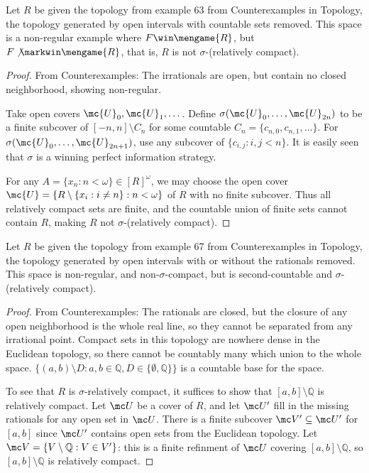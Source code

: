   \begin{ex}
  Let $R$ be given the topology from example 63 from Counterexamples in Topology, the topology generated by open intervals with countable sets removed. This space is a non-regular example where $F \win \mengame{R}$, but $F \not\markwin \mengame{R}$, that is, $R$ is not $\sigma$-(relatively compact).
  \end{ex}

  \begin{proof}
  From Counterexamples: The irrationals are open, but contain no closed neighborhood, showing non-regular.

  Take open covers $\mc{U}_0,\mc{U}_1,\dots$. Define $\sigma(\mc{U}_0,\dots,\mc{U}_{2n})$ to be a finite subcover of $[-n,n]\setminus C_n$ for some countable $C_n=\{c_{n,0}, c_{n,1}, \dots\}$. For $\sigma(\mc{U}_0,\dots,\mc{U}_{2n+1})$, use any subcover of $\{c_{i,j} : i,j < n\}$. It is easily seen that $\sigma$ is a winning perfect information strategy.

  For any $A=\{x_n:n<\omega\} \in [R]^\omega$, we may choose the open cover $\mc{U} = \{R \setminus \{x_i: i \not= n\} : n < \omega \}$ of $R$ with no finite subcover. Thus all relatively compact sets are finite, and the countable union of finite sets cannot contain $R$, making $R$ not $\sigma$-(relatively compact).
  \end{proof}

  \begin{ex}
  Let $R$ be given the topology from example 67 from Counterexamples in Topology, the topology generated by open intervals with or without the rationals removed. This space is non-regular, and non-$\sigma$-compact, but is second-countable and $\sigma$-(relatively compact).
  \end{ex}

  \begin{proof}
  From Counterexamples: The rationals are closed, but the closure of any open neighborhood is the whole real line, so they cannot be separated from any irrational point. Compact sets in this topology are nowhere dense in the Euclidean topology, so there cannot be countably many which union to the whole space. $\{(a,b)\setminus D : a,b\in\mathbb{Q},D\in\{\emptyset,\mathbb{Q}\}\}$ is a countable base for the space.

  To see that $R$ is $\sigma$-relatively compact, it suffices to show that $[a,b]\setminus\mathbb{Q}$ is relatively compact. Let $\mc U$ be a cover of $R$, and let $\mc U'$ fill in the missing rationals for any open set in $\mc U$. There is a finite subcover $\mc V'\subseteq \mc U'$ for $[a,b]$ since $\mc U'$ contains open sets from the Euclidean topology. Let $\mc V= \{V\setminus\mathbb{Q}:V\in V'\}$: this is a finite refinment of $\mc U$ covering $[a,b]\setminus\mathbb{Q}$, so $[a,b]\setminus\mathbb{Q}$ is relatively compact.
  \end{proof}

